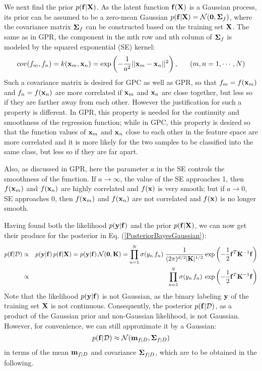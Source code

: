 \documentclass{article}
\begin{document}
We next find the prior $p({\bf f}|{\bf X})$. As the latent 
function ${\bf f}({\bf X})$ is a Gaussian process, its prior 
can be assumed to be a zero-mean Gaussian 
$p({\bf f}|{\bf X})={\cal N}({\bf 0},{\bf\Sigma}_f)$, where the 
covariance matrix ${\bf\Sigma}_f$ can be constructed based on 
the training set ${\bf X}$. The same as in GPR, the component 
in the mth row and nth column of ${\bf\Sigma}_f$ is modeled by 
the squared exponential (SE) kernel:
\begin{equation}
  cov(f_m,f_n)=k({\bf x}_m,{\bf x}_n)
  =\exp\left(-\frac{1}{a^2}||{\bf x}_m-{\bf x}_n||^2\right),
  \;\;\;\;\;\;(m,n=1,\cdots,N)
\end{equation}
Such a covariance matrix is desired for GPC as well as GPR, so
that $f_m=f({\bf x}_m)$ and $f_n=f({\bf x}_n)$ are more correlated
if ${\bf x}_m$ and ${\bf x}_n$ are close together, but less so if
they are farther away from each other. However the justification 
for such a property is different. In GPR, this property is needed
for the continuity and smoothness of the regression function; while
in GPC, this property is desired so that the function values of 
${\bf x}_m$ and ${\bf x}_n$ close to each other in the feature 
space are more correlated and it is more likely for the two samples
to be classified into the same class, but less so if they are far
apart.

Also, as discussed in GPR, here the parameter $a$ in the SE controls 
the smoothness of the function. If $a\rightarrow\infty$, the value of 
the SE approaches 1, then $f({\bf x}_m)$ and $f({\bf x}_n)$ are highly
correlated and $f({\bf x})$ is very smooth; but if $a\rightarrow 0$, 
SE approaches 0, then $f({\bf x}_m)$ and $f({\bf x}_n)$ are not 
correlated and $f({\bf x})$ is no longer smooth.

Having found both the likelihood $p({\bf y}|{\bf f})$ and the prior
$p({\bf f}|{\bf X})$, we can now get their produce for the posterior 
in Eq. (\ref{PosteriorBayesGaussian}):
\begin{eqnarray}
  p({\bf f}|{\cal D})&\propto& p({\bf y}|{\bf f})\,p({\bf f}|{\bf X})
  =p({\bf y}|{\bf f})\,{\cal N}({\bf 0},{\bf K})
  =\prod_{n=1}^N\sigma(y_n\,f_n)\;
  \frac{1}{(2\pi)^{d/2}|{\bf K}|^{1/2}}
    \exp\left(-\frac{1}{2}{\bf f}^T{\bf K}^{-1}{\bf f}\right)
    \nonumber\\
    &\propto&\prod_{n=1}^N\sigma(y_n\,f_n)\;
    \exp\left(-\frac{1}{2}{\bf f}^T{\bf K}^{-1}{\bf f}\right)
  \label{PosteriorBayesGaussian1}
\end{eqnarray}
Note that the likelihood $p({\bf y}|{\bf f})$ is not Gaussian, as 
the binary labeling ${\bf y}$ of the training set ${\bf X}$ is not 
continuous. Consequently, the posterior $p({\bf f}|{\cal D})$, as a 
product of the Gaussian prior and non-Gaussian likelihood, is not 
Gaussian. However, for convenience, we can still approximate it by 
a Gaussian: 
\begin{equation}
  p({\bf f}|{\cal D})\approx {\cal N}({\bf m}_{f|D},{\bf\Sigma}_{f|D})
\end{equation}
in terms of the mean ${\bf m}_{f|D}$ and covariance ${\bf\Sigma}_{f|D}$,
which are to be obtained in the following.
\end{document}
